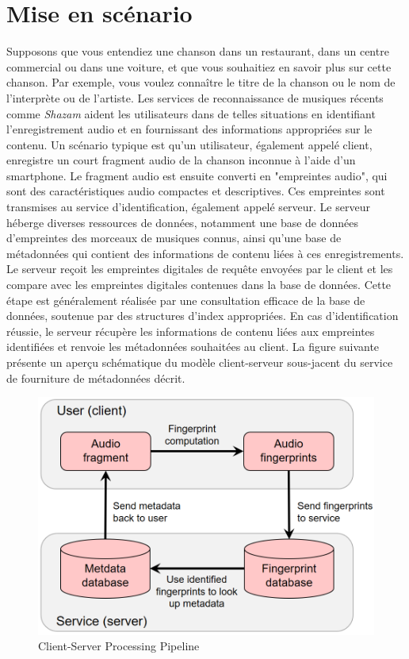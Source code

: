 \documentclass[10pt, report, english]{report}
\begin{document}
\section{Mise en scénario}
Supposons que vous entendiez une chanson dans un restaurant, dans un centre commercial ou dans une voiture, et que vous souhaitiez en savoir plus sur cette chanson. Par exemple, vous voulez connaître le titre de la chanson ou le nom de l'interprète ou de l'artiste. Les services de reconnaissance de musiques récents comme \textit{Shazam} aident les utilisateurs dans de telles situations en identifiant l'enregistrement audio et en fournissant des informations appropriées sur le contenu. Un scénario typique est qu'un utilisateur, également appelé client, enregistre un court fragment audio de la chanson inconnue à l'aide d'un smartphone. Le fragment audio est ensuite converti en "empreintes audio", qui sont des caractéristiques audio compactes et descriptives. Ces empreintes sont transmises au service d'identification, également appelé serveur. Le serveur héberge diverses ressources de données, notamment une base de données d'empreintes des morceaux de musiques connus, ainsi qu'une base de métadonnées qui contient des informations de contenu liées à ces enregistrements. Le serveur reçoit les empreintes digitales de requête envoyées par le client et les compare avec les empreintes digitales contenues dans la base de données. Cette étape est généralement réalisée par une consultation efficace de la base de données, soutenue par des structures d'index appropriées. En cas d'identification réussie, le serveur récupère les informations de contenu liées aux empreintes identifiées et renvoie les métadonnées souhaitées au client. La figure suivante présente un aperçu schématique du modèle client-serveur sous-jacent du service de fourniture de métadonnées décrit.\\

\begin{figure}[H]
	\centering
	\includegraphics[scale=0.3]{img/general_schema.png}
	\caption{Client-Server Processing Pipeline}
\end{figure}
\end{document}

